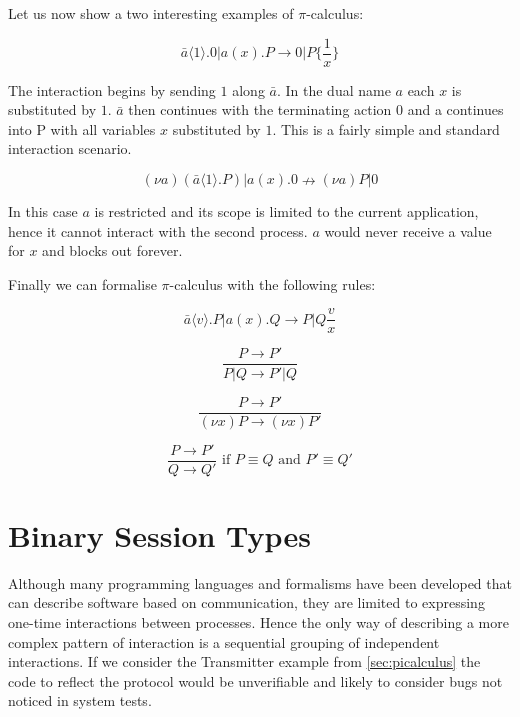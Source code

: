 Let us now show a two interesting examples of $\pi$-calculus:

\[ \bar{a} \langle 1 \rangle .0 | a(x).P \rightarrow 0 | P \lbrace \frac{1}{x} \rbrace \]

The interaction begins by sending $1$ along $\bar{a}$. In the dual name $a$ each $x$ is substituted by $1$. $\bar{a}$ then continues with the terminating action $0$ and a continues into P with all variables $x$ substituted by $1$. This is a fairly simple and standard interaction scenario.

$$ (\nu a)(\bar{a} \langle 1 \rangle.P) | a(x).0 \nrightarrow (\nu a) P|0 $$

In this case $a$ is restricted and its scope is limited to the current application, hence it cannot interact with the second process. $a$ would never receive a value for $x$ and blocks out forever.

Finally we can formalise ${\pi}$-calculus with the following rules:

\begin{equation} \bar{a} \langle v \rangle .P | a(x).Q \rightarrow P|Q {\frac{v}{x}} \end{equation}

\begin{equation} \frac{P \rightarrow P'}{P|Q \rightarrow P'|Q} \end{equation}

\begin{equation} \frac{P \rightarrow P'}{(\nu x) P \rightarrow (\nu x) P'} \end{equation}

\begin{equation} \frac{P \rightarrow P'}{Q \rightarrow Q'} \mbox{ if } P \equiv Q \mbox{ and } P' \equiv Q' \end{equation}
\newline


	
\section{Binary Session Types}
\label{sec:binsessiontypes}
		
	Although many programming languages and formalisms have been developed that can describe software based on communication, they are limited to expressing one-time interactions between processes. Hence the only way of describing a more complex pattern of interaction is a sequential grouping of independent interactions. If we consider the Transmitter example from \autoref{sec:picalculus} the code to reflect the protocol would be unverifiable and likely to consider bugs not noticed in system tests.

